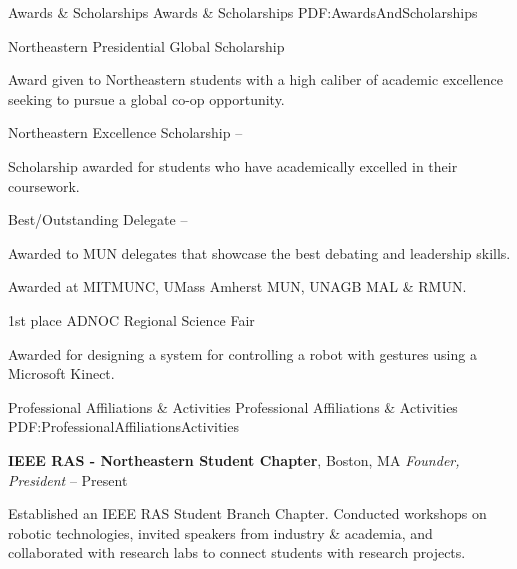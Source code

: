 \documentclass[letterpaper,MMMyyyy,nonstopmode]{simpleresumecv}
\begin{document}
\begin{Body}


\Section
{Awards \&\newline
Scholarships}
{Awards \& Scholarships}
{PDF:AwardsAndScholarships}

\Gap
Northeastern Presidential Global Scholarship
\hfill
{}
\begin{Detail}
Award given to Northeastern students with a high caliber of academic excellence seeking to pursue a global co-op opportunity.
\end{Detail}
\SectionSpace

\Gap
Northeastern Excellence Scholarship
\hfill
{} -- 
\begin{Detail}
Scholarship awarded for students who have academically excelled in their coursework.
\end{Detail}

\Gap
Best/Outstanding Delegate
\hfill
{} --
\begin{Detail}
Awarded to MUN delegates that showcase the best debating and leadership skills.
\end{Detail}
\begin{Detail}
Awarded at MITMUNC, UMass Amherst MUN, UNAGB MAL \& RMUN.
\end{Detail}

\Gap
1st place ADNOC Regional Science Fair
\hfill
{}
\begin{Detail}
Awarded for designing a system for controlling a robot with gestures using a Microsoft Kinect.
\end{Detail}


\Section
{Professional Affiliations\newline
\& Activities}
{Professional Affiliations \& Activities}
{PDF:ProfessionalAffiliationsActivities}

\Entry
\textbf{IEEE RAS - Northeastern Student Chapter},
Boston, MA
\Gap
\textit{Founder, President}
\hfill
{} --
Present
\begin{Detail}
\Item
Established an IEEE RAS Student Branch Chapter. Conducted workshops on robotic technologies, invited speakers from industry \& academia, and collaborated with research labs to connect students with research projects.
\end{Detail}


\end{Body}
\end{document}
